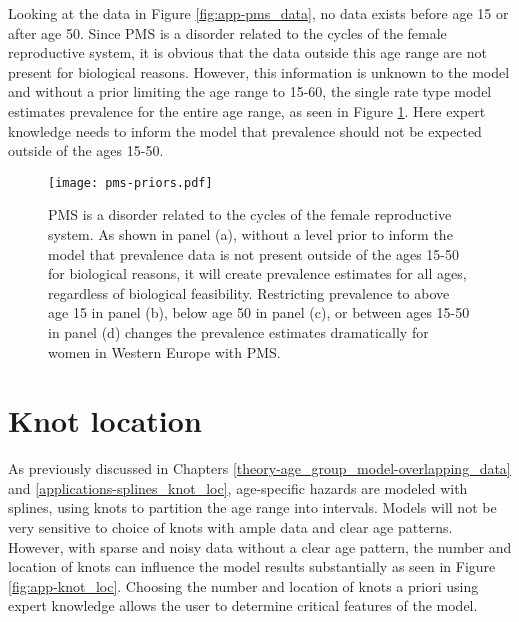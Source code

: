 Looking at the data in Figure \ref{fig:app-pms_data}, no data exists
before age 15 or after age 50.  Since PMS is a disorder related to the
cycles of the female reproductive system, it is obvious that the data
outside this age range are not present for biological reasons.
However, this information is unknown to the model and without a prior
limiting the age range to 15-60, the single rate type model estimates
prevalence for the entire age range, as seen in Figure
\ref{fig:app-prios_on_level}.  Here expert knowledge needs to inform
the model that prevalence should not be expected outside of the ages
15-50.

    \begin{figure}
        \begin{center}
            \texttt{[image: pms-priors.pdf]}
        \end{center}
        \caption{PMS is a disorder related to the cycles of the female
          reproductive system.  As shown in panel (a), without a level
          prior to inform the model that prevalence data is not
          present outside of the ages 15-50 for biological reasons, it
          will create prevalence estimates for all ages, regardless of
          biological feasibility.  Restricting prevalence to above age
          15 in panel (b), below age 50 in panel (c), or between ages
          15-50 in panel (d) changes the prevalence estimates
          dramatically for women in Western Europe with PMS.}
        \label{fig:app-prios_on_level}
    \end{figure}

\section{Knot location}
As previously discussed in Chapters
\ref{theory-age_group_model-overlapping_data} and
\ref{applications-splines_knot_loc}, age-specific hazards are modeled
with splines, using knots to partition the age range into intervals.
Models will not be very sensitive to choice of knots with ample data
and clear age patterns.  However, with sparse and noisy data without a
clear age pattern, the number and location of knots can influence the
model results substantially as seen in Figure \ref{fig:app-knot_loc}.
Choosing the number and location of knots a priori using expert
knowledge allows the user to determine critical features of the model.

